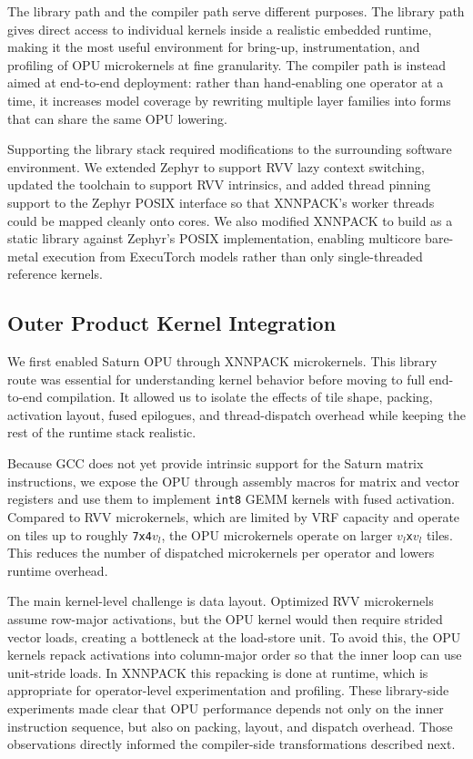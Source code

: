 The library path and the compiler path serve different purposes. The library path gives direct access to individual kernels inside a realistic embedded runtime, making it the most useful environment for bring-up, instrumentation, and profiling of OPU microkernels at fine granularity. The compiler path is instead aimed at end-to-end deployment: rather than hand-enabling one operator at a time, it increases model coverage by rewriting multiple layer families into forms that can share the same OPU lowering.

Supporting the library stack required modifications to the surrounding software environment. We extended Zephyr to support RVV lazy context switching, updated the toolchain to support RVV intrinsics, and added thread pinning support to the Zephyr POSIX interface so that XNNPACK's worker threads could be mapped cleanly onto cores. We also modified XNNPACK to build as a static library against Zephyr's POSIX implementation, enabling multicore bare-metal execution from ExecuTorch models rather than only single-threaded reference kernels.

\subsection{Outer Product Kernel Integration}\label{sec:xnnpack-kernel}

We first enabled Saturn OPU through XNNPACK microkernels. This library route was essential for understanding kernel behavior before moving to full end-to-end compilation. It allowed us to isolate the effects of tile shape, packing, activation layout, fused epilogues, and thread-dispatch overhead while keeping the rest of the runtime stack realistic.

Because GCC does not yet provide intrinsic support for the Saturn matrix instructions, we expose the OPU through assembly macros for matrix and vector registers and use them to implement \texttt{int8} GEMM kernels with fused activation. Compared to RVV microkernels, which are limited by VRF capacity and operate on tiles up to roughly \texttt{7x4$v_l$}, the OPU microkernels operate on larger \texttt{$v_l$x$v_l$} tiles. This reduces the number of dispatched microkernels per operator and lowers runtime overhead.

The main kernel-level challenge is data layout. Optimized RVV microkernels assume row-major activations, but the OPU kernel would then require strided vector loads, creating a bottleneck at the load-store unit. To avoid this, the OPU kernels repack activations into column-major order so that the inner loop can use unit-stride loads. In XNNPACK this repacking is done at runtime, which is appropriate for operator-level experimentation and profiling. These library-side experiments made clear that OPU performance depends not only on the inner instruction sequence, but also on packing, layout, and dispatch overhead. Those observations directly informed the compiler-side transformations described next.

